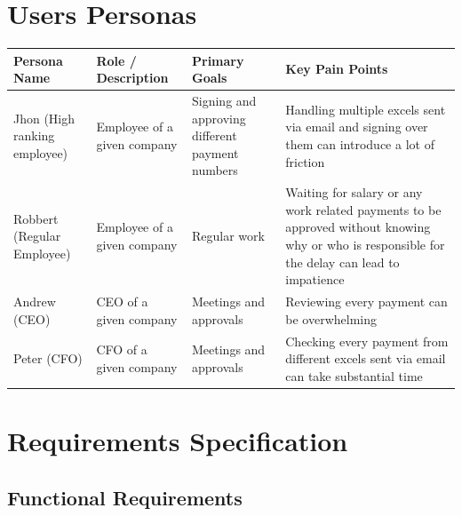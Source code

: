 \documentclass[11pt,a4paper]{article}
\begin{document}
\section{Users Personas}

\begin{longtable}[]{@{}
  >{\centering\arraybackslash}p{}
  >{\centering\arraybackslash}p{}
  >{\centering\arraybackslash}p{}
  >{\centering\arraybackslash}p{}@{}}
\toprule\noalign{}
\begin{minipage}[b]{\linewidth}\raggedright
Persona Name
\end{minipage} & \begin{minipage}[b]{\linewidth}\raggedright
Role / Description
\end{minipage} & \begin{minipage}[b]{\linewidth}\raggedright
Primary Goals
\end{minipage} & \begin{minipage}[b]{\linewidth}\raggedright
Key Pain Points
\end{minipage} \\
\midrule\noalign{}
\endhead
\bottomrule\noalign{}
\endlastfoot
Jhon (High ranking employee) & Employee of a given company & Signing and
approving different payment numbers & Handling multiple excels sent via
email and signing over them can introduce a lot of friction \\
Robbert (Regular Employee) & Employee of a given company & Regular work
& Waiting for salary or any work related payments to be approved without
knowing why or who is responsible for the delay can lead to
impatience \\
Andrew (CEO) & CEO of a given company & Meetings and approvals &
Reviewing every payment can be overwhelming \\
Peter (CFO) & CFO of a given company & Meetings and approvals & Checking
every payment from different excels sent via email can take substantial
time \\
\end{longtable}

\textbf{\hfill\break
}

\section{Requirements Specification}

\subsection{Functional Requirements}
\end{document}
